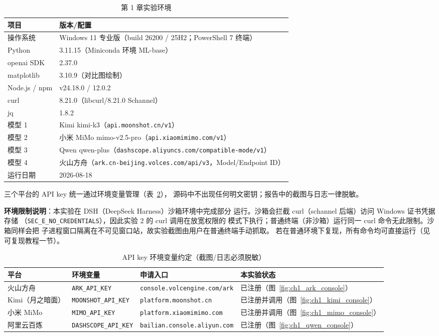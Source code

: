 \begin{table}[H]
\centering
\caption{第 1 章实验环境}
\label{tab:ch1_env}
\small
\setlength{\tabcolsep}{4pt}
\begin{tabular}{lp{9.2cm}}
\toprule
\textbf{项目} & \textbf{版本/配置} \\
\midrule
操作系统 & Windows 11 专业版（build 26200 / 25H2；PowerShell 7 终端） \\
Python & 3.11.15（Miniconda 环境 ML-base） \\
openai SDK & 2.37.0 \\
matplotlib & 3.10.9（对比图绘制） \\
Node.js / npm & v24.18.0 / 12.0.2 \\
curl & 8.21.0（libcurl/8.21.0 Schannel） \\
jq & 1.8.2 \\
模型 1 & Kimi kimi-k3（\nolinkurl{api.moonshot.cn/v1}） \\
模型 2 & 小米 MiMo mimo-v2.5-pro（\nolinkurl{api.xiaomimimo.com/v1}） \\
模型 3 & Qwen qwen-plus（\nolinkurl{dashscope.aliyuncs.com/compatible-mode/v1}） \\
模型 4 & 火山方舟（\nolinkurl{ark.cn-beijing.volces.com/api/v3}，Model/Endpoint ID） \\
运行日期 & 2026-08-18 \\
\bottomrule
\end{tabular}
\end{table}

三个平台的 API key 统一通过环境变量管理（表~\ref{tab:ch1_keys}），
源码中不出现任何明文密钥；报告中的截图与日志一律脱敏。

\textbf{环境限制说明}：本实验在 DSH（DeepSeek Harness）沙箱环境中完成部分
运行。沙箱会拦截 curl（schannel 后端）访问 Windows 证书凭据存储
（\texttt{SEC\_E\_NO\_CREDENTIALS}），因此实验 2 的 curl 调用在放宽权限的
模式下执行；普通终端（非沙箱）运行同一 curl 命令无此限制。沙箱同样会把
子进程窗口隔离在不可见窗口站，故实验截图由用户在普通终端手动抓取。
若在普通环境下复现，所有命令均可直接运行（见可复现教程一节）。

\begin{table}[H]
\centering
\caption{API key 环境变量约定（截图/日志必须脱敏）}
\label{tab:ch1_keys}
\small
\setlength{\tabcolsep}{4pt}
\begin{tabular}{lp{3.4cm}p{3.4cm}p{3.6cm}}
\toprule
\textbf{平台} & \textbf{环境变量} & \textbf{申请入口} & \textbf{本实验状态} \\
\midrule
火山方舟 & \texttt{ARK\_API\_KEY} & \nolinkurl{console.volcengine.com/ark} & 已注册（图~\ref{fig:ch1_ark_console}） \\
Kimi（月之暗面） & \texttt{MOONSHOT\_API\_KEY} & \nolinkurl{platform.moonshot.cn} & 已注册并调用（图~\ref{fig:ch1_kimi_console}） \\
小米 MiMo & \texttt{MIMO\_API\_KEY} & \nolinkurl{platform.xiaomimimo.com} & 已注册并调用（图~\ref{fig:ch1_mimo_console}） \\
阿里云百炼 & \texttt{DASHSCOPE\_API\_KEY} & \nolinkurl{bailian.console.aliyun.com} & 已注册（图~\ref{fig:ch1_qwen_console}） \\
\bottomrule
\end{tabular}
\end{table}

